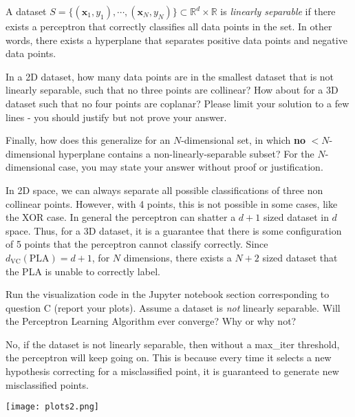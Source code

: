 \documentclass{article}
\begin{document}
\begin{problem}[4]
  A dataset $S = \{(\mathbf{x}_1, y_1),\cdots,(\mathbf{x}_N, y_N)\} \subset \mathbb{R}^d \times \mathbb{R}$ is \emph{linearly separable} if there exists a perceptron that correctly classifies all data points in the set. In other words, there exists a hyperplane that separates positive data points and negative data points.

  In a 2D dataset, how many data points are in the smallest dataset that is not linearly separable, such that no three points are collinear? How about for a 3D dataset such that no four points are coplanar? Please limit your solution to a few lines - you should justify but not prove your answer.

  Finally, how does this generalize for an $N$-dimensional set, in which \textbf{no} $<$$N$-dimensional hyperplane contains a non-linearly-separable subset? For the $N$-dimensional case, you may state your answer without proof or justification.
\end{problem}
\begin{solution}
In 2D space, we can always separate all possible classifications of three non collinear points. However, with 4 points, this is not possible in some cases, like the XOR case. In general the perceptron can shatter a $d+1$ sized dataset in $d$ space. Thus, for a 3D dataset, it is a guarantee that there is some configuration of 5 points that the perceptron cannot classify correctly. Since $d_{\text{VC}}(\text{PLA}) = d + 1$, for $N$ dimensions, there exists a $N+2$ sized dataset that the PLA is unable to correctly label.
\end{solution}
\newpage

\begin{problem}[2]
  Run the visualization code in the Jupyter notebook section corresponding to question C (report your plots). Assume a dataset is \emph{not} linearly separable. Will the Perceptron Learning Algorithm ever converge? Why or why not?
\end{problem}
\begin{solution}
No, if the dataset is not linearly separable, then without a max_iter threshold, the perceptron will keep going on. This is because every time it selects a new hypothesis correcting for a misclassified point, it is guaranteed to generate new misclassified points. 
\begin{center}
        \texttt{[image: plots2.png]}
    \label{fig:enter-label}
\end{center}
\end{solution}
\end{document}
